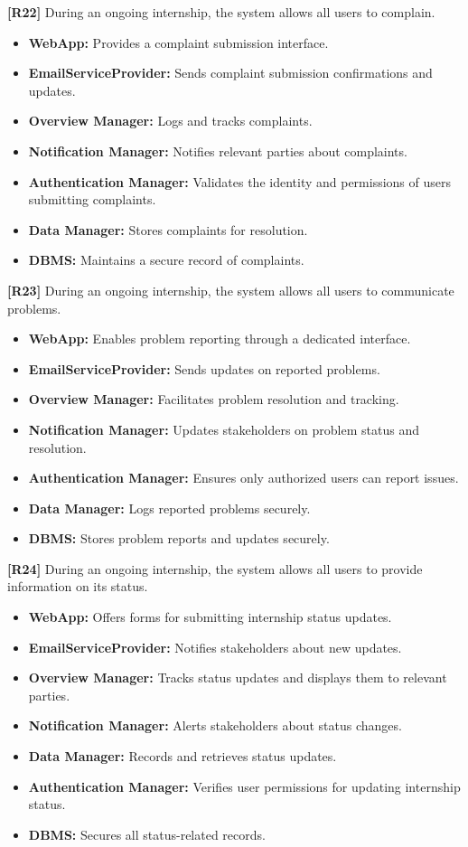 \textbf{[R22]} During an ongoing internship, the system allows all users to complain.  
\begin{itemize}
    \item \textbf{WebApp:} Provides a complaint submission interface.  
    \item \textbf{EmailServiceProvider:} Sends complaint submission confirmations and updates.  
    \item \textbf{Overview Manager:} Logs and tracks complaints.  
    \item \textbf{Notification Manager:} Notifies relevant parties about complaints.  
    \item \textbf{Authentication Manager:} Validates the identity and permissions of users submitting complaints.  
    \item \textbf{Data Manager:} Stores complaints for resolution.  
    \item \textbf{DBMS:} Maintains a secure record of complaints.  
\end{itemize}  

\textbf{[R23]} During an ongoing internship, the system allows all users to communicate problems.  
\begin{itemize}
    \item \textbf{WebApp:} Enables problem reporting through a dedicated interface.  
    \item \textbf{EmailServiceProvider:} Sends updates on reported problems.  
    \item \textbf{Overview Manager:} Facilitates problem resolution and tracking.  
    \item \textbf{Notification Manager:} Updates stakeholders on problem status and resolution.  
    \item \textbf{Authentication Manager:} Ensures only authorized users can report issues.  
    \item \textbf{Data Manager:} Logs reported problems securely.  
    \item \textbf{DBMS:} Stores problem reports and updates securely.  
\end{itemize}  

\textbf{[R24]} During an ongoing internship, the system allows all users to provide information on its status.  
\begin{itemize}
    \item \textbf{WebApp:} Offers forms for submitting internship status updates.  
    \item \textbf{EmailServiceProvider:} Notifies stakeholders about new updates.  
    \item \textbf{Overview Manager:} Tracks status updates and displays them to relevant parties.  
    \item \textbf{Notification Manager:} Alerts stakeholders about status changes.  
    \item \textbf{Data Manager:} Records and retrieves status updates.  
    \item \textbf{Authentication Manager:} Verifies user permissions for updating internship status.  
    \item \textbf{DBMS:} Secures all status-related records.  
\end{itemize}  

